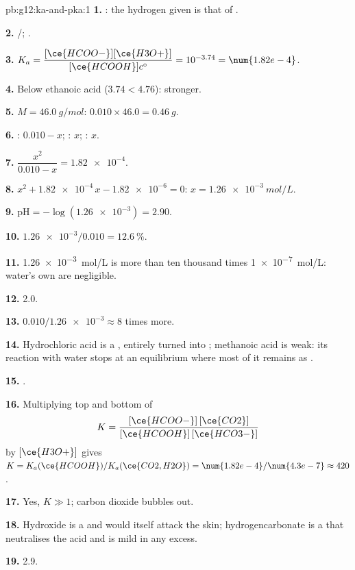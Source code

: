 \begin{solution}{pb:g12:ka-and-pka:1}
\textbf{1.} : the hydrogen given is that of .

\textbf{2.} /; .

\textbf{3.} $K_a = \dfrac{[\ce{HCOO-}][\ce{H3O+}]}{[\ce{HCOOH}]c^\circ} =
10^{-3.74} = \num{1.82e-4}$.

\textbf{4.} Below ethanoic acid ($3.74 < 4.76$): stronger.

\textbf{5.} $M = \qty{46.0}{g/mol}$: $0.010 \times 46.0 = \qty{0.46}{g}$.

\textbf{6.} : $0.010 - x$; : $x$; : $x$.

\textbf{7.} $\dfrac{x^2}{0.010 - x} = \num{1.82e-4}$.

\textbf{8.} $x^2 + \num{1.82e-4}\,x - \num{1.82e-6} = 0$:
$x = \qty{1.26e-3}{mol/L}$.

\textbf{9.} $\mathrm{pH} = -\log(\num{1.26e-3}) = 2.90$.

\textbf{10.} $\num{1.26e-3}/0.010 = \qty{12.6}{\percent}$.

\textbf{11.} \qty{1.26e-3}{mol/L} is more than ten thousand times
\qty{1e-7}{mol/L}: water's own  are negligible.

\textbf{12.}  2.0.

\textbf{13.} $0.010 / \num{1.26e-3} \approx 8$ times more.

\textbf{14.} Hydrochloric acid is a , entirely turned into
; methanoic acid is weak: its reaction with water stops at an
equilibrium where most of it remains as .

\textbf{15.} .

\textbf{16.} Multiplying top and bottom of
\[
  K = \frac{[\ce{HCOO-}]\,[\ce{CO2}]}{[\ce{HCOOH}]\,[\ce{HCO3-}]}
\]
by $[\ce{H3O+}]$ gives $K = K_a(\ce{HCOOH}) / K_a(\ce{CO2,H2O}) =
\num{1.82e-4}/\num{4.3e-7} \approx 420$.

\textbf{17.} Yes, $K \gg 1$; carbon dioxide bubbles out.

\textbf{18.} Hydroxide is a  and would itself attack the skin;
hydrogencarbonate is a  that neutralises the acid and is mild
in any excess.

\textbf{19.}  2.9.
\end{solution}
